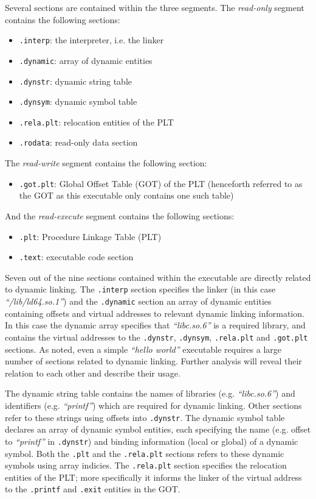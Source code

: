 \documentclass[12pt, a4paper]{article}
\begin{document}
Several sections are contained within the three segments. The \textit{read-only} segment contains the following sections:

\begin{itemize}
	\item \texttt{.interp}: the interpreter, i.e. the linker
	\item \texttt{.dynamic}: array of dynamic entities
	\item \texttt{.dynstr}: dynamic string table
	\item \texttt{.dynsym}: dynamic symbol table
	\item \texttt{.rela.plt}: relocation entities of the PLT
	\item \texttt{.rodata}: read-only data section
\end{itemize}

The \textit{read-write} segment contains the following section:

\begin{itemize}
	\item \texttt{.got.plt}: Global Offset Table (GOT) of the PLT (henceforth referred to as the GOT as this executable only contains one such table)
\end{itemize}

And the \textit{read-execute} segment contains the following sections:

\begin{itemize}
	\item \texttt{.plt}: Procedure Linkage Table (PLT)
	\item \texttt{.text}: executable code section
\end{itemize}

Seven out of the nine sections contained within the executable are directly related to dynamic linking. The \texttt{.interp} section specifies the linker (in this case \textit{``/lib/ld64.so.1''}) and the \texttt{.dynamic} section an array of dynamic entities containing offsets and virtual addresses to relevant dynamic linking information. In this case the dynamic array specifies that \textit{``libc.so.6''} is a required library, and contains the virtual addresses to the \texttt{.dynstr}, \texttt{.dynsym}, \texttt{.rela.plt} and \texttt{.got.plt} sections. As noted, even a simple \textit{``hello world''} executable requires a large number of sections related to dynamic linking. Further analysis will reveal their relation to each other and describe their usage.

The dynamic string table contains the names of libraries (e.g. \textit{``libc.so.6''}) and identifiers (e.g. \textit{``printf''}) which are required for dynamic linking. Other sections refer to these strings using offsets into \texttt{.dynstr}. The dynamic symbol table declares an array of dynamic symbol entities, each specifying the name (e.g. offset to \textit{``printf''} in \texttt{.dynstr}) and binding information (local or global) of a dynamic symbol. Both the \texttt{.plt} and the \texttt{.rela.plt} sections refers to these dynamic symbols using array indicies. The \texttt{.rela.plt} section specifies the relocation entities of the PLT; more specifically it informs the linker of the virtual address to the \texttt{.printf} and \texttt{.exit} entities in the GOT.
\end{document}

